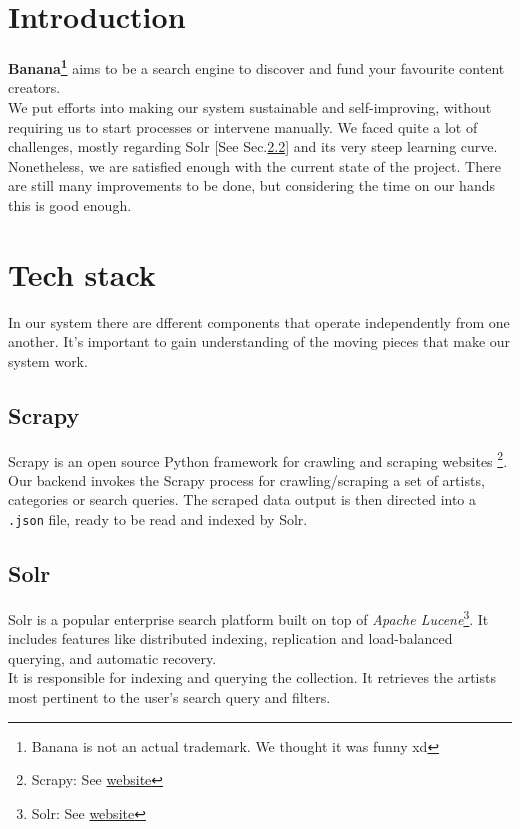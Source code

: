 \documentclass[tikz,14pt]{article}
\newcommand\sitename{Banana\texttrademark}
\begin{document}






\section{Introduction} \label{sec:intro}
\textbf{\sitename\footnote{Banana is not an actual trademark. We thought it was funny xd}} aims to be a search engine to discover and fund your favourite content creators.\\
We put efforts into making our system sustainable and self-improving, without requiring us to start processes or intervene manually. We faced quite a lot of challenges, mostly regarding Solr [See Sec.\ref{sec:solr}] and its very steep learning curve.\\
Nonetheless, we are satisfied enough with the current state of the project. There are still many improvements to be done, but considering the time on our hands this is good enough.\\


\section{Tech stack} \label{sec:stack}
In our system there are dfferent components that operate independently from one another. It's important to gain understanding of the moving pieces that make our system work.
\subsection{Scrapy} \label{sec:scrapy}
Scrapy is an open source Python framework for crawling and scraping websites \footnote{Scrapy: See \href{https://scrapy.org}{website}}. Our backend invokes the Scrapy process for crawling/scraping a set of artists, categories or search queries. The scraped data output is then directed into a \verb|.json| file, ready to be read and indexed by Solr.
\subsection{Solr} \label{sec:solr}
Solr is a popular enterprise search platform built on top of \textit{Apache Lucene}\footnote{Solr: See \href{https://solr.apache.org/guide/solr/9_0/index.html}{website}}. It includes features like distributed indexing, replication and load-balanced querying, and automatic recovery.\\
It is responsible for indexing and querying the collection. It retrieves the artists most pertinent to the user's search query and filters.
\end{document}
